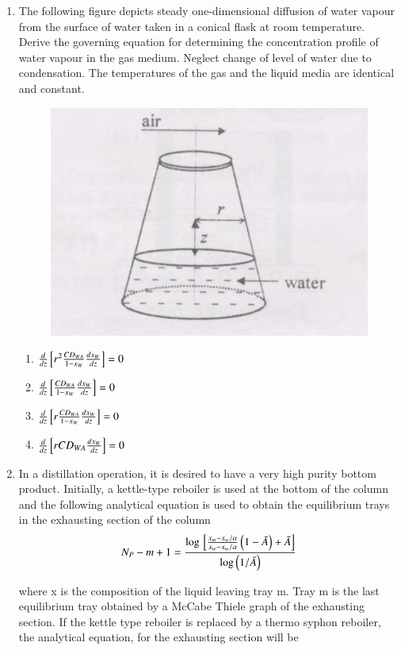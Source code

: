 \documentclass[journal,12pt,onecolumn]{IEEEtran}
\theoremstyle{remark}
\begin{document}
\begin{enumerate}
   \item The following figure depicts steady one-dimensional diffusion of water vapour from the surface of water taken in a conical flask at room temperature. Derive the governing equation for determining the concentration profile of water vapour in the gas medium. Neglect change of level of water due to condensation. The temperatures of the gas and the liquid media are identical and constant.

   \begin{figure}[H]
       \centering
       \includegraphics[width=0.5\columnwidth]{figs/47.png}
       \caption{}
       \label{fig:47}
   \end{figure}

\begin{enumerate}
    \item $\frac{d}{dz}\sbrak{r^2\frac{CD_{WA}}{1-x_W}\frac{dx_W}{dz}}=0$
    \item $\frac{d}{dz}\sbrak{\frac{CD_{WA}}{1-x_W}\frac{dx_W}{dz}}=0$
    \item $\frac{d}{dz}\sbrak{r\frac{CD_{WA}}{1-x_W}\frac{dx_W}{dz}}=0$
    \item $\frac{d}{dz}\sbrak{rCD_{WA}\frac{dx_W}{dz}}=0$
\end{enumerate}

   \item In a distillation operation, it is desired to have a very high purity bottom product. Initially, a kettle-type reboiler is used at the bottom of the column and the following analytical equation is used to obtain the equilibrium trays in the exhausting section of the column
   \begin{align*}
       N_P-m+1=\frac{\log\sbrak{\frac{x_m-x_w/\alpha}{x_w-x_w/\alpha}\brak{1-\Bar{A}}+\Bar{A}}}{\log \brak{1/\Bar{A}}}
   \end{align*}
   
   where x is the composition of the liquid leaving tray m. Tray m is the last equilibrium tray obtained by a McCabe Thiele graph of the exhausting section. If the kettle type reboiler is replaced by a thermo syphon reboiler, the analytical equation, for the exhausting section will be


\end{enumerate}
\end{document}
